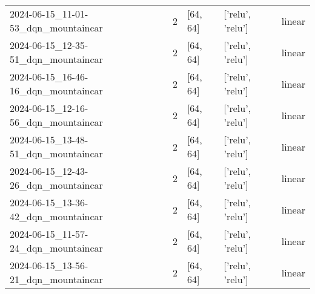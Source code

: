\documentclass[a4paper,12pt]{article}
\begin{document}
\begin {center}
{\begin{tabular}{lllll}
        2024-06-15\_11-01-53\_dqn\_mountaincar & 2              & {[}64, 64{]}      & {[}'relu', 'relu'{]}   & linear                    \\
        2024-06-15\_12-35-51\_dqn\_mountaincar & 2              & {[}64, 64{]}      & {[}'relu', 'relu'{]}   & linear                    \\
        2024-06-15\_16-46-16\_dqn\_mountaincar & 2              & {[}64, 64{]}      & {[}'relu', 'relu'{]}   & linear                    \\
        2024-06-15\_12-16-56\_dqn\_mountaincar & 2              & {[}64, 64{]}      & {[}'relu', 'relu'{]}   & linear                    \\
        2024-06-15\_13-48-51\_dqn\_mountaincar & 2              & {[}64, 64{]}      & {[}'relu', 'relu'{]}   & linear                    \\
        2024-06-15\_12-43-26\_dqn\_mountaincar & 2              & {[}64, 64{]}      & {[}'relu', 'relu'{]}   & linear                    \\
        2024-06-15\_13-36-42\_dqn\_mountaincar & 2              & {[}64, 64{]}      & {[}'relu', 'relu'{]}   & linear                    \\
        2024-06-15\_11-57-24\_dqn\_mountaincar & 2              & {[}64, 64{]}      & {[}'relu', 'relu'{]}   & linear                    \\
        2024-06-15\_13-56-21\_dqn\_mountaincar & 2              & {[}64, 64{]}      & {[}'relu', 'relu'{]}   & linear                    \\
    \end{tabular}
}
\end{center}
\end{document}
